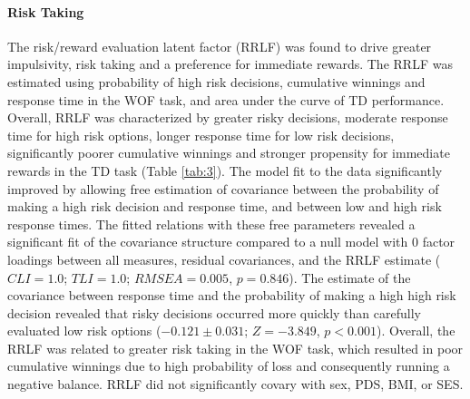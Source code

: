 \documentclass[utf8]{frontiersSCNS} %
\begin{document}
\paragraph{Risk Taking} The risk/reward evaluation latent factor (RRLF) was found to drive greater impulsivity, risk taking and a preference for immediate rewards. The RRLF was estimated using probability of high risk decisions, cumulative winnings and response time in the WOF task, and area under the curve of TD performance. Overall, RRLF was characterized by greater risky decisions, moderate response time for high risk options, longer response time for low risk decisions, significantly poorer cumulative winnings and stronger propensity for immediate rewards in the TD task (Table \ref{tab:3}). The model fit to the data significantly improved by allowing free estimation of covariance between the probability of making a high risk decision and response time, and between low and high risk response times. The fitted relations with these free parameters revealed a significant fit of the covariance structure compared to a null model with 0 factor loadings between all measures, residual covariances, and the RRLF estimate ($CLI = 1.0$; $TLI = 1.0$; $RMSEA = 0.005$, $p = 0.846$). The estimate of the covariance between response time and the probability of making a high high risk decision revealed that risky decisions occurred more quickly than carefully evaluated low risk options ($-0.121\pm0.031$; $Z=-3.849$, $p<0.001$). Overall, the RRLF was related to greater risk taking in the WOF task, which resulted in poor cumulative winnings due to high probability of loss and consequently running a negative balance. RRLF did not significantly covary with sex, PDS, BMI, or SES.
\end{document}
